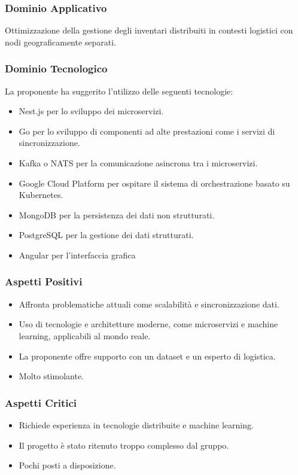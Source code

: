 \documentclass[a4paper, 12pt]{article}
\begin{document}
\subsubsection{Dominio Applicativo}
Ottimizzazione della gestione degli inventari distribuiti in contesti logistici con nodi geograficamente separati.

\subsubsection{Dominio Tecnologico}
La proponente ha suggerito l’utilizzo delle seguenti tecnologie:
\begin{itemize}
    \item Nest.js per lo sviluppo dei microservizi.
    \item Go per lo sviluppo di componenti ad alte prestazioni come i servizi di sincronizzazione.
    \item Kafka o NATS per la comunicazione asincrona tra i microservizi.
    \item Google Cloud Platform per ospitare il sistema di orchestrazione basato su Kubernetes.
    \item MongoDB per la persistenza dei dati non strutturati.
    \item PostgreSQL per la gestione dei dati strutturati.
    \item Angular per l’interfaccia grafica
\end{itemize}

\subsubsection{Aspetti Positivi}
\begin{itemize}
    \item Affronta problematiche attuali come scalabilità e sincronizzazione dati.
    \item Uso di tecnologie e architetture moderne, come microservizi e machine learning, applicabili al mondo reale.
    \item La proponente offre supporto con un dataset e un esperto di logistica.
    \item Molto stimolante.
\end{itemize}

\subsubsection{Aspetti Critici}
\begin{itemize}
    \item Richiede esperienza in tecnologie distribuite e machine learning.
    \item Il progetto è stato ritenuto troppo complesso dal gruppo.
    \item Pochi posti a disposizione.
\end{itemize}
\end{document}
